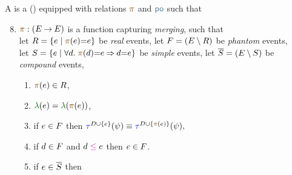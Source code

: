 \begin{definition}
  \label{def:po}
  A \PwTc{} is a \PwT{} () equipped
  with relations $\rmrg$ and
  $\rpox$ such that 
  \begin{enumerate}[,label=(\textsc{m}\arabic*),ref=\textsc{m}\arabic*]
    \setcounter{enumi}{7}
  \item \label{pom-m} 
    $\fmrg{} : (\aEvs\fun\aEvs)$
    is a function capturing \emph{merging}, such that 
    \\
    let $\reEvs=\{\aEv\mid\fmrg{\aEv}{=}\aEv\}$ be \emph{real} events,
    let $F=(E\setminus R)$ be \emph{phantom} events,\\
    let $\umEvs=\{\aEv\mid\forall\bEv.\;\fmrg{\bEv}{=}\aEv \limplies \bEv{=}\aEv\}$ be \emph{simple} events,
    let $\overline{S}=(E\setminus S)$ be \emph{compound} events,
    \begin{multicols}{2}
    \begin{enumerate}%
    \item \label{pom-m-chain}
      $\fmrg{\aEv}\in\reEvs$,
    \item \label{pom-m-lambda} 
      $\labeling(\aEv)=\labeling(\fmrg{\aEv})$,
    \item \label{pom-m-tau} 
      if $e\in F$ then
      \begin{math}
        \aTr{\bEvs\cup\{\aEv\}}{\bForm}\riff \aTr{\bEvs\cup\{\fmrg{\aEv}\}}{\bForm},
      \end{math}
    \item \label{pom-m-le}
      if $d\in F$ and $\bEv\le\aEv$ then $e\in F$.
    \item \label{pom-m-kappa} 
      if $e\in\overline{S}$ then 
    \end{enumerate}
    \end{multicols}


\end{enumerate}
\end{definition}
